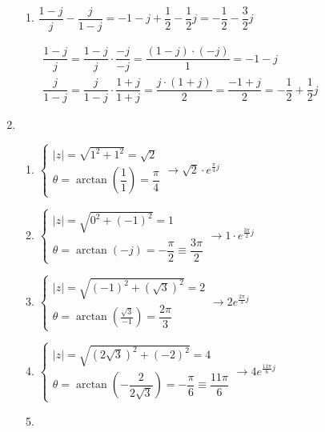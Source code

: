 \begin{enumerate}[label=\color{red}\textbf{\arabic*)}]
\begin{enumerate}[label=\color{red}\textbf{\textbf{\alph*)}}]
            \item {} 

                $\dfrac{1-j}{j}-\dfrac{j}{1-j}=-1-j+\dfrac{1}{2}-\dfrac{1}{2}j=-\dfrac{1}{2}-\dfrac{3}{2}j$

                $\begin{array}{l}
                    \dfrac{1-j}{j}=\dfrac{1-j}{j}\cdot \dfrac{-j}{-j}=\dfrac{(1-j)\cdot (-j)}{1}=-1-j\\
                    \dfrac{j}{1-j}=\dfrac{j}{1-j}\cdot \dfrac{1+j}{1+j}=\dfrac{j\cdot (1+j)}{2}=\dfrac{-1+j}{2}=-\dfrac{1}{2}+\dfrac{1}{2}j
                \end{array}$
        \end{enumerate}
    \item {}
        \begin{enumerate}[label=\color{red}\textbf{\textbf{\textbf{\alph*)}}}]
            \item {} 

                $\begin{cases}
                    |z| = \sqrt{1^2+1^2}=\sqrt{2}\\
                    \theta=\arctan\left( \dfrac{1}{1} \right) =\dfrac{\pi}{4}
                \end{cases}\longrightarrow \sqrt{2}\cdot e^{\frac{\pi}{4} j}  $
            \item {} 

                $\begin{cases}
                    |z|=\sqrt{0^2+(-1)^2}=1\\
                    \theta=\arctan(-j)=-\dfrac{\pi}{2}\equiv \dfrac{3\pi}{2}
                \end{cases}\longrightarrow 1\cdot e^{\frac{3\pi}{2} j} $
            \item {} 

                $\begin{cases}
                    |z|=\sqrt{(-1)^2+(\sqrt{3})^2 } =2\\
                    \theta=\arctan\left( \frac{\sqrt{3}}{-1}  \right) =\dfrac{2\pi}{3}
                \end{cases}\longrightarrow 2e^{\frac{2\pi}{3} j} $
            \item {} 

                $\begin{cases}
                   |z|=\sqrt{(2\sqrt{3})^2+(-2)^2 }  = 4\\
                   \theta=\arctan\left( -\dfrac{2}{2\sqrt{3} } \right) =-\dfrac{\pi}{6}\equiv \dfrac{11\pi}{6}
                \end{cases}\longrightarrow 4e^{\frac{11\pi}{6} j} $
            \item {} 


\end{enumerate}
\end{enumerate}
